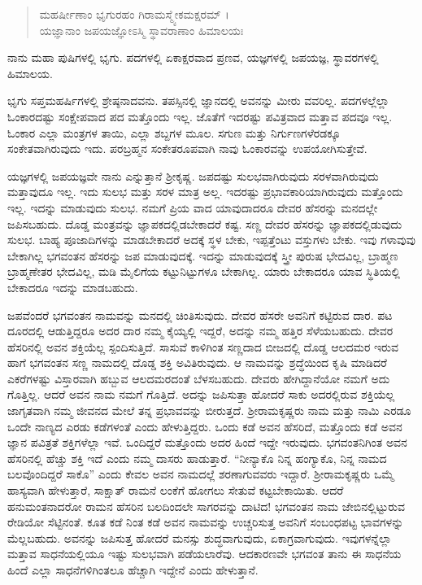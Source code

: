\begin{verse}
ಮಹರ್ಷೀಣಾಂ ಭೃಗುರಹಂ ಗಿರಾಮಸ್ಮ್ಯೇಕಮಕ್ಷರಮ್ ।\\ಯಜ್ಞಾನಾಂ ಜಪಯಜ್ಞೋಽಸ್ಮಿ ಸ್ಥಾವರಾಣಾಂ ಹಿಮಾಲಯಃ 
\end{verse}

{\small ನಾನು ಮಹಾ ಪುಷಿಗಳಲ್ಲಿ ಭೃಗು. ಪದಗಳಲ್ಲಿ ಏಕಾಕ್ಷರವಾದ ಪ್ರಣವ, ಯಜ್ಞಗಳಲ್ಲಿ ಜಪಯಜ್ಞ, ಸ್ಥಾವರಗಳಲ್ಲಿ ಹಿಮಾಲಯ.}

ಭೃಗು ಸಪ್ತಮಹರ್ಷಿಗಳಲ್ಲಿ ಶ್ರೇಷ್ಠನಾದವನು. ತಪಸ್ಸಿನಲ್ಲಿ ಜ್ಞಾನದಲ್ಲಿ ಅವನನ್ನು ಮೀರು ವವರಿಲ್ಲ. ಪದಗಳಲ್ಲೆಲ್ಲಾ ಓಂಕಾರದಷ್ಟು ಸಂಕ್ಷೇಪವಾದ ಪದ ಮತ್ತೊಂದು ಇಲ್ಲ. ಜೊತೆಗೆ ಇದರಷ್ಟು ಪವಿತ್ರವಾದ ಮತ್ತಾವ ಪದವೂ ಇಲ್ಲ. ಓಂಕಾರ ಎಲ್ಲಾ ಮಂತ್ರಗಳ ತಾಯಿ, ಎಲ್ಲಾ ಶಬ್ದಗಳ ಮೂಲ. ಸಗುಣ ಮತ್ತು ನಿರ್ಗುಣಗಳೆರಡಕ್ಕೂ ಸಂಕೇತವಾಗಿರುವುದು ಇದು. ಪರಬ್ರಹ್ಮನ ಸಂಕೇತರೂಪವಾಗಿ ನಾವು ಓಂಕಾರವನ್ನು ಉಪಯೋಗಿಸುತ್ತೇವೆ.

ಯಜ್ಞಗಳಲ್ಲಿ ಜಪಯಜ್ಞವೇ ನಾನು ಎನ್ನುತ್ತಾನೆ ಶ್ರೀಕೃಷ್ಣ. ಜಪದಷ್ಟು ಸುಲಭವಾಗಿರುವುದು ಸರಳವಾಗಿರುವುದು ಮತ್ತಾವುದೂ ಇಲ್ಲ. ಇದು ಸುಲಭ ಮತ್ತು ಸರಳ ಮಾತ್ರ ಅಲ್ಲ. ಇದರಷ್ಟು ಪ್ರಭಾವಕಾರಿಯಾಗಿರುವುದು ಮತ್ತೊಂದು ಇಲ್ಲ. ಇದನ್ನು ಮಾಡುವುದು ಸುಲಭ. ನಮಗೆ ಪ್ರಿಯ ವಾದ ಯಾವುದಾದರೂ ದೇವರ ಹೆಸರನ್ನು ಮನದಲ್ಲೇ ಜಪಿಸಬಹುದು. ದೊಡ್ಡ ಮಂತ್ರವನ್ನು ಜ್ಞಾಪಕದಲ್ಲಿಡಬೇಕಾದರೆ ಕಷ್ಟ. ಸಣ್ಣ ದೇವರ ಹೆಸರನ್ನು ಜ್ಞಾಪಕದಲ್ಲಿಡುವುದು ಸುಲಭ. ಬಾಹ್ಯ ಪೂಜಾದಿಗಳನ್ನು ಮಾಡಬೇಕಾದರೆ ಅದಕ್ಕೆ ಸ್ಥಳ ಬೇಕು, ಇಪ್ಪತ್ತೆಂಟು ವಸ್ತುಗಳು ಬೇಕು. ಇವು ಗಳಾವುವು ಬೇಕಾಗಿಲ್ಲ ಭಗವಂತನ ಹೆಸರನ್ನು ಜಪ ಮಾಡುವುದಕ್ಕೆ. ಇದನ್ನು ಮಾಡುವುದಕ್ಕೆ ಸ್ತ್ರೀ ಪುರುಷ ಭೇದವಿಲ್ಲ, ಬ್ರಾಹ್ಮಣ ಬ್ರಾಹ್ಮಣೇತರ ಭೇದವಿಲ್ಲ, ಮಡಿ ಮೈಲಿಗೆಯ ಕಟ್ಟುನಿಟ್ಟುಗಳೂ ಬೇಕಾಗಿಲ್ಲ. ಯಾರು ಬೇಕಾದರೂ ಯಾವ ಸ್ಥಿತಿಯಲ್ಲಿ ಬೇಕಾದರೂ ಇದನ್ನು ಮಾಡಬಹುದು.

ಜಪವೆಂದರೆ ಭಗವಂತನ ನಾಮವನ್ನು ಮನದಲ್ಲಿ ಚಿಂತಿಸುವುದು. ದೇವರ ಹೆಸರೇ ಅವನಿಗೆ ಕಟ್ಟಿರುವ ದಾರ. ಪಟ ದೂರದಲ್ಲಿ ಆಡುತ್ತಿದ್ದರೂ ಅದರ ದಾರ ನಮ್ಮ ಕೈಯ್ಯಲ್ಲಿ ಇದ್ದರೆ, ಅದನ್ನು ನಮ್ಮ ಹತ್ತಿರ ಸೆಳೆಯಬಹುದು. ದೇವರ ಹೆಸರಿನಲ್ಲಿ ಅವನ ಶಕ್ತಿಯೆಲ್ಲ ಸ್ಪಂದಿಸುತ್ತಿದೆ. ಸಾಸುವೆ ಕಾಳಿಗಿಂತ ಸಣ್ಣದಾದ ಬೀಜದಲ್ಲಿ ದೊಡ್ಡ ಆಲದಮರ ಇರುವ ಹಾಗೆ ಭಗವಂತನ ಸಣ್ಣ ನಾಮದಲ್ಲಿ ದೊಡ್ಡ ಶಕ್ತಿ ಅವಿತಿರುವುದು. ಆ ನಾಮವನ್ನು ಶ್ರದ್ಧೆಯಿಂದ ಕೃಷಿ ಮಾಡಿದರೆ ಎಕರೆಗಳಷ್ಟು ವಿಸ್ತಾರವಾಗಿ ಹಬ್ಬುವ ಆಲದಮರದಂತೆ ಬೆಳಸಬಹುದು. ದೇವರು ಹೇಗಿದ್ದಾನೆಯೋ ನಮಗೆ ಅದು ಗೊತ್ತಿಲ್ಲ. ಆದರೆ ಅವನ ನಾಮ ನಮಗೆ ಗೊತ್ತಿದೆ. ಅದನ್ನು ಜಪಿಸುತ್ತಾ ಹೋದರೆ ಸಾಕು ಅದರಲ್ಲಿರುವ ಶಕ್ತಿಯೆಲ್ಲ ಜಾಗೃತವಾಗಿ ನಮ್ಮ ಜೀವನದ ಮೇಲೆ ತನ್ನ ಪ್ರಭಾವವನ್ನು ಬೀರುತ್ತದೆ. ಶ್ರೀರಾಮಕೃಷ್ಣರು ನಾಮ ಮತ್ತು ನಾಮಿ ಎರಡೂ ಒಂದೇ ನಾಣ್ಯದ ಎರಡು ಕಡೆಗಳಂತೆ ಎಂದು ಹೇಳುತ್ತಿದ್ದರು. ಒಂದು ಕಡೆ ಅವನ ಹೆಸರಿದೆ, ಮತ್ತೊಂದು ಕಡೆ ಅವನ ಜ್ಞಾನ ಪವಿತ್ರತೆ ಶಕ್ತಿಗಳೆಲ್ಲಾ ಇವೆ. ಒಂದಿದ್ದರೆ ಮತ್ತೊಂದು ಅದರ ಹಿಂದೆ ಇದ್ದೇ ಇರುವುದು. ಭಗವಂತನಿಗಿಂತ ಅವನ ಹೆಸರಿನಲ್ಲಿ ಹೆಚ್ಚು ಶಕ್ತಿ ಇದೆ ಎಂದು ನಮ್ಮ ದಾಸರು ಹಾಡುತ್ತಾರೆ. “ನೀನ್ಯಾಕೊ ನಿನ್ನ ಹಂಗ್ಯಾಕೊ, ನಿನ್ನ ನಾಮದ ಬಲವೊಂದಿದ್ದರೆ ಸಾಕೊ” ಎಂದು ಕೇವಲ ಅವನ ನಾಮದಲ್ಲೆ ಶರಣಾಗುವವರು ಇದ್ದಾರೆ. ಶ್ರೀರಾಮಕೃಷ್ಣರು ಒಮ್ಮೆ ಹಾಸ್ಯವಾಗಿ ಹೇಳುತ್ತಾರೆ, ಸಾಕ್ಷಾತ್ ರಾಮನೆ ಲಂಕೆಗೆ ಹೋಗಲು ಸೇತುವೆ ಕಟ್ಟಬೇಕಾಯಿತು. ಆದರೆ ಹನುಮಂತನಾದರೋ ರಾಮನ ಹೆಸರಿನ ಬಲದಿಂದಲೇ ಸಾಗರವನ್ನು ದಾಟಿದ! ಭಗವಂತನ ನಾಮ ಜೇಬಿನಲ್ಲಿಟ್ಟುರುವ ರೇಡಿಯೋ ಸೆಟ್ಟಿನಂತೆ. ಕೂತ ಕಡೆ ನಿಂತ ಕಡೆ ಅವನ ನಾಮವನ್ನು ಉಚ್ಚರಿಸುತ್ತ ಅವನಿಗೆ ಸಂಬಂಧಪಟ್ಟ ಭಾವಗಳನ್ನು ಮೆಲ್ಲಬಹುದು. ಅವನನ್ನು ಜಪಿಸುತ್ತ ಹೋದರೆ ಮನಸ್ಸು ಶುದ್ಧವಾಗುವುದು, ಏಕಾಗ್ರವಾಗುವುದು. ಇವುಗಳನ್ನೆಲ್ಲಾ ಮತ್ತಾವ ಸಾಧನೆಯಲ್ಲಿಯೂ ಇಷ್ಟು ಸುಲಭವಾಗಿ ಪಡೆಯಲಾರೆವು. ಆದಕಾರಣವೇ ಭಗವಂತ ತಾನು ಈ ಸಾಧನೆಯ ಹಿಂದೆ ಎಲ್ಲಾ ಸಾಧನೆಗಳಿಗಿಂತಲೂ ಹೆಚ್ಚಾಗಿ ಇದ್ದೇನೆ ಎಂದು ಹೇಳುತ್ತಾನೆ.

